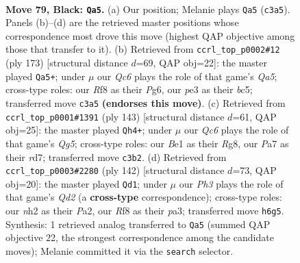 \documentclass[11pt]{article}
\begin{document}
\clearpage

\begin{figure}[p]\centering
\begin{subfigure}{0.46\textwidth}\centering
\resizebox{\linewidth}{!}{%
\newchessgame
\chessboard[
  setfen={1k3r1r/p5p1/7p/6PP/3PQ3/2q1P3/7N/4b2K b - - 0 79},
  showmover=false,
  pgfstyle=straightmove, color=movearrow, markmove={c3-a5}
]}
\caption{}
\end{subfigure}\hfill
\begin{subfigure}{0.46\textwidth}\centering
\resizebox{\linewidth}{!}{%
\newchessgame
\chessboard[
  setfen={8/7k/6p1/1PBP2Pp/q1r1p3/5P2/1R1KQ3/8 b - - 0 87},
  showmover=false,
  pgfstyle=straightmove, color=movearrow, markmove={a4-a5}
]}
\caption{}
\end{subfigure}
\\[4pt]
\begin{subfigure}{0.46\textwidth}\centering
\resizebox{\linewidth}{!}{%
\newchessgame
\chessboard[
  setfen={6rk/3R4/1p3p2/1P1p1p1P/3P1Pq1/4Q1N1/7K/8 b - - 0 72},
  showmover=false,
  pgfstyle=straightmove, color=movearrow, markmove={g4-h4}
]}
\caption{}
\end{subfigure}\hfill
\begin{subfigure}{0.46\textwidth}\centering
\resizebox{\linewidth}{!}{%
\newchessgame
\chessboard[
  setfen={6k1/4qp2/6p1/6b1/1P1p2P1/p2R1P2/P2Q4/7K w - - 3 72},
  showmover=false,
  pgfstyle=straightmove, color=movearrow, markmove={d2-d1}
]}
\caption{}
\end{subfigure}
\caption{\textbf{Move 79, Black: \texttt{Qa5}.} (a) Our position; Melanie plays \texttt{Qa5} (\texttt{c3a5}). Panels (b)--(d) are the retrieved master positions whose correspondence most drove this move (highest QAP objective among those that transfer to it). (b) Retrieved from \texttt{ccrl\_top\_p0002\#12} (ply 173) [structural distance $d$=69, QAP obj=22]: the master played \texttt{Qa5+}; under $\mu$ our \emph{Qc6} plays the role of that game's \emph{Qa5}; cross-type roles: our \emph{R}f8 as their \emph{P}g6, our \emph{p}e3 as their \emph{b}c5; transferred move \texttt{c3a5} \textbf{(endorses this move)}. (c) Retrieved from \texttt{ccrl\_top\_p0001\#1391} (ply 143) [structural distance $d$=61, QAP obj=25]: the master played \texttt{Qh4+}; under $\mu$ our \emph{Qc6} plays the role of that game's \emph{Qg5}; cross-type roles: our \emph{B}e1 as their \emph{R}g8, our \emph{P}a7 as their \emph{r}d7; transferred move \texttt{c3b2}. (d) Retrieved from \texttt{ccrl\_top\_p0003\#2280} (ply 142) [structural distance $d$=73, QAP obj=20]: the master played \texttt{Qd1}; under $\mu$ our \emph{Ph3} plays the role of that game's \emph{Qd2} (a \textbf{cross-type} correspondence); cross-type roles: our \emph{n}h2 as their \emph{P}a2, our \emph{R}f8 as their \emph{p}a3; transferred move \texttt{h6g5}. Synthesis: 1 retrieved analog transferred to \texttt{Qa5} (summed QAP objective 22, the strongest correspondence among the candidate moves); Melanie committed it via the \texttt{search} selector.}
\label{fig:thought-m157}
\end{figure}
\end{document}
